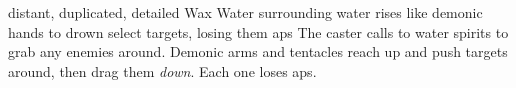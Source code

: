   {distant, duplicated, detailed}%
  {Wax}%
  {Water}%
  {}%
  {surrounding water rises like demonic hands to drown select targets, losing them  \glspl{ap}}%
  {
    The caster calls to water spirits to grab any enemies around.
    Demonic arms and tentacles reach up and push targets around, then drag them \emph{down}.
    Each one loses  \glspl{ap}.
  }
